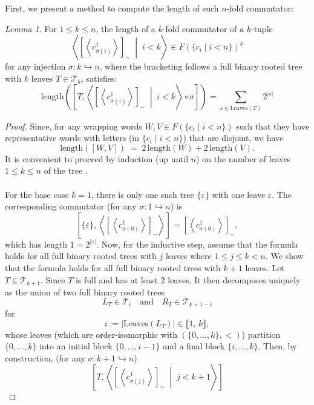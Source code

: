 \documentclass[11pt, a4paper, oneside]{article}
\theoremstyle{remark}
\theoremstyle{lemma}
\newtheorem*{lemma}{Lemma}
\begin{document}
First, we present a method to compute the length of such \(n\)-fold commutator:
\begin{lemma}
For $1\leq k\leq n$, the length of a \(k\)-fold commutator of a \(k\)-tuple
\[
\left\langle \left[ \left\langle c_{\sigma(i)}^1 \right\rangle \right]_{\sim} \;\middle|\; i<k \right\rangle\in F(\{c_i\mid i<n\})^{k}
\]
for any injection $\sigma:k\hookrightarrow n$, where the bracketing follows a full binary rooted tree with $k$ leaves $T\in\mathcal{T}_k$, satisfies:
\[
\mathrm{length}\left(\left[ T, \left\langle \left[ \left\langle c_{\sigma(i)}^1 \right\rangle \right]_{\sim} \;\middle|\; i<k \right\rangle \circ \sigma \right]\right)=\sum_{s\in\mathrm{Leaves}(T)}2^{|s|}
\]
\end{lemma}
\begin{proof}
Since, for any wrapping words $W,V \in F\!\left(\{c_i \mid i<n\}\right)$ such that they have representative words with letters (in $\{c_i \mid i<n\}$) that are disjoint, we have
\[
\mathrm{length}\!\left([W,V]\right) \;=\; 2\,\mathrm{length}\!\left(W\right) + 2\,\mathrm{length}\!\left(V\right).
\]
It is convenient to proceed by induction (up until \(n\)) on the number of leaves \(1\leq k\leq n\) of the tree .
\\\\
For the base case $k = 1$, there is only one such tree \(\{\varepsilon\}\) with one leave $\varepsilon$. The corresponding commutator (for any $\sigma:1\hookrightarrow n$) is
\[
\left[ \{\varepsilon\}, \left\langle \left[ \left\langle c_{\sigma(0)}^1 \right\rangle \right]_{\sim}\right\rangle \right]
= \left[ \left\langle c_{\sigma(0)}^1 \right\rangle \right]_{\sim},
\]
which has length \(1 = 2^{|\varepsilon|} \).
Now, for the inductive step, assume that the formula holds for all full binary rooted trees with $j$ leaves where $1\leq j\leq k<n$. We show that the formula holds for all full binary rooted trees with $k+1$ leaves. Let $T\in\mathcal{T}_{k+1}$. Since $T$ is full and has at least $2$ leaves. It then decomposes uniquely as the union of two full binary rooted trees 
\[
L_T \in \mathcal{T}_{i} \quad \text{and} \quad R_T \in \mathcal{T}_{k+1-i}
\] 
for 
\[
i := \left|\mathrm{Leaves}\!\left(L_T\right)\right| \in \llbracket 1,\,k\rrbracket,
\] 
whose leaves (which are order-isomorphic with $\left(\{0,\dots,k\},<\right)$) partition $\{0,\dots,k\}$ into an initial block $\{0,\dots,i-1\}$ and a final block $\{i,\dots,k\}$. Then, by construction, (for any $\sigma:k+1\hookrightarrow n$)
\[
\left[T, \left\langle \left[ \left\langle c_{\sigma(j)}^1 \right\rangle \right]_{\sim} \;\middle|\; j<k+1 \right\rangle \right] 
\]
\end{proof}
\end{document}
